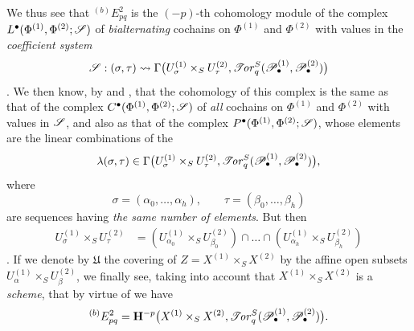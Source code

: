 \begin{env}[6.6.4]
We thus see that ${}^{(b)}E_{pq}^2$ is the $(-p)$-th cohomology
module of the complex $L^\bullet(\Phi^{(1)},\Phi^{(2)};\mathscr{S})$
of \emph{bialternating} cochains on $\Phi^{(1)}$ and $\Phi^{(2)}$ with
values in the \emph{coefficient system}
\[
  \mathscr{S}:(\sigma,\tau)\leadsto
  \Gamma\bigl(
    U_\sigma^{(1)}\times_SU_\tau^{(2)},
    \mathscr{T}\!\mathit{or}_q^S(\mathscr{P}_\bullet^{(1)},\mathscr{P}_\bullet^{(2)})
  \bigr)
\]
.  We then know, by  and
, that the cohomology of this complex is the same as that of the
complex $C^\bullet(\Phi^{(1)},\Phi^{(2)};\mathscr{S})$ of \emph{all} cochains on
$\Phi^{(1)}$ and $\Phi^{(2)}$ with values in $\mathscr{S}$, and also as that of the
complex $P^\bullet(\Phi^{(1)},\Phi^{(2)};\mathscr{S})$,
whose elements are the linear combinations of the
\[
  \lambda(\sigma,\tau)\in
  \Gamma\bigl(
    U_\sigma^{(1)}\times_SU_\tau^{(2)},
    \mathscr{T}\!\mathit{or}_q^S(\mathscr{P}_\bullet^{(1)},\mathscr{P}_\bullet^{(2)})
  \bigr),
\]
where
\[
  \sigma=(\alpha_0,\ldots,\alpha_h),
  \qquad
  \tau=(\beta_0,\ldots,\beta_h)
\]
are sequences having \emph{the same number of elements}.  But then
\[
\begin{split}
  U_\sigma^{(1)}\times_SU_\tau^{(2)}
  &=
  (U_{\alpha_0}^{(1)}\times_SU_{\beta_0}^{(2)})
  \cap\ldots\cap
  (U_{\alpha_h}^{(1)}\times_SU_{\beta_h}^{(2)})
\end{split}
\]
.  If we denote by $\mathfrak U$ the covering of
$Z=X^{(1)}\times_SX^{(2)}$ by the affine open subsets
$U_\alpha^{(1)}\times_SU_\beta^{(2)}$, we finally see, taking into account
that $X^{(1)}\times_SX^{(2)}$ is a \emph{scheme}, that by virtue of
 we have
\[
  {}^{(b)}E_{pq}^2
  =
  \mathbf{H}^{-p}
  \bigl(
    X^{(1)}\times_SX^{(2)},\mathscr{T}\!\mathit{or}_q^S
    (\mathscr{P}_\bullet^{(1)},\mathscr{P}_\bullet^{(2)})
  \bigr).
\]


\end{env}
